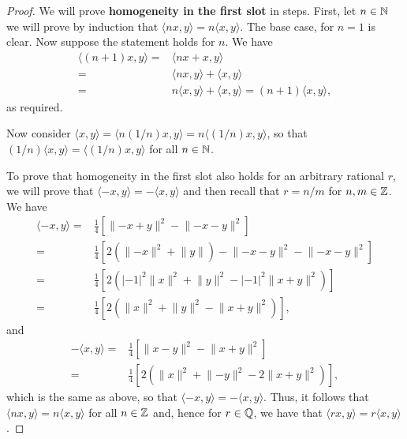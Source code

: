 \begin{proof}
    We will prove \textbf{homogeneity in the first slot} in steps. First, let $n\in\mathbb{N}$ we will prove by induction that $\langle nx,y\rangle=n\langle x,y\rangle$. The base case, for $n=1$ is clear. Now suppose the statement holds for $n$. We have
    \begin{align*}
        \langle (n+1)x,y\rangle =& \langle nx+x,y\rangle\\
        =& \langle nx,y\rangle + \langle x,y\rangle\\
        =& n\langle x,y\rangle +\langle x,y\rangle = (n+1)\langle x,y\rangle,
    \end{align*}
    as required.

    Now consider $\langle x,y\rangle =\langle n(1/n)x,y\rangle =n\langle (1/n)x,y\rangle$, so that $(1/n)\langle x,y\rangle =\langle (1/n)x,y\rangle$ for all $n\in\mathbb{N}$.

    To prove that homogeneity in the first slot also holds for an arbitrary rational $r$, we will prove that $\langle -x,y\rangle=-\langle x,y\rangle$ and then recall that $r=n/m$ for $n,m\in\mathbb{Z}$. We have 
    \begin{align*}
        \langle -x,y\rangle =& \frac{1}{4}[\lVert -x+y\rVert^2-\lVert -x-y\rVert^2]\\
        =& \frac{1}{4}[2(\lVert -x\rVert^2+\lVert y\rVert)-\lVert -x-y\rVert^2-\lVert -x-y\rVert^2]\\
        =& \frac{1}{4}[2(\lvert -1\rvert^2\lVert x\rVert^2+\lVert y\rVert^2-\lvert -1\rvert^2\lVert x+y\rVert^2)]\\
        =& \frac{1}{4}[2(\lVert x\rVert^2+\lVert y\rVert^2-\lVert x+y\rVert^2)],
    \end{align*}
    and
    \begin{align*}
        -\langle x,y\rangle =& \frac{1}{4}[\lVert x-y\rVert^2-\lVert x+y\rVert^2]\\
        =& \frac{1}{4}[2(\lVert x\rVert^2+\lVert -y\rVert^2-2\lVert x+y\rVert^2)],
    \end{align*}
    which is the same as above, so that $\langle -x,y\rangle =-\langle x,y\rangle$. Thus, it follows that $\langle nx,y\rangle =n\langle x,y\rangle$ for all $n\in\mathbb{Z}$ and, hence for $r\in\mathbb{Q}$, we have that $\langle rx,y\rangle =r\langle x,y\rangle$.


\end{proof}
